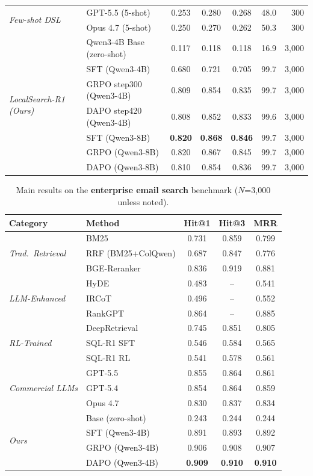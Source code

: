 \documentclass[11pt]{article}
\begin{document}
\begin{table}[t]
\begin{tabular}{llccccr}
\multirow{2}{*}{\textit{Few-shot DSL}}
& GPT-5.5 (5-shot) & 0.253 & 0.280 & 0.268 & 48.0 & 300 \\
& Opus 4.7 (5-shot) & 0.250 & 0.270 & 0.262 & 50.3 & 300 \\
\midrule
\multirow{7}{*}{\textit{LocalSearch-R1 (Ours)}}
& Qwen3-4B Base (zero-shot) & 0.117 & 0.118 & 0.118 & 16.9 & 3{,}000 \\
& SFT (Qwen3-4B) & 0.680 & 0.721 & 0.705 & 99.7 & 3{,}000 \\
& GRPO step300 (Qwen3-4B) & 0.809 & 0.854 & 0.835 & 99.7 & 3{,}000 \\
& DAPO step420 (Qwen3-4B) & 0.808 & 0.852 & 0.833 & 99.6 & 3{,}000 \\
& SFT (Qwen3-8B) & \textbf{0.820} & \textbf{0.868} & \textbf{0.846} & 99.7 & 3{,}000 \\
& GRPO (Qwen3-8B) & 0.820 & 0.867 & 0.845 & 99.7 & 3{,}000 \\
& DAPO (Qwen3-8B) & 0.810 & 0.854 & 0.836 & 99.7 & 3{,}000 \\
\bottomrule
\end{tabular}
\end{table}


\begin{table}[t]
\centering
\small
\caption{Main results on the \textbf{enterprise email search} benchmark ($N$=3{,}000 unless noted).}
\label{tab:main_email}
\begin{tabular}{llccc}
\toprule
\textbf{Category} & \textbf{Method} & \textbf{Hit@1} & \textbf{Hit@3} & \textbf{MRR} \\
\midrule
\multirow{3}{*}{\textit{Trad.\ Retrieval}}
& BM25 & 0.731 & 0.859 & 0.799 \\
& RRF (BM25+ColQwen) & 0.687 & 0.847 & 0.776 \\
& BGE-Reranker & 0.836 & 0.919 & 0.881 \\
\midrule
\multirow{3}{*}{\textit{LLM-Enhanced}}
& HyDE & 0.483 & -- & 0.541 \\
& IRCoT & 0.496 & -- & 0.552 \\
& RankGPT & 0.864 & -- & 0.885 \\
\midrule
\multirow{3}{*}{\textit{RL-Trained}}
& DeepRetrieval & 0.745 & 0.851 & 0.805 \\
& SQL-R1 SFT & 0.546 & 0.584 & 0.565 \\
& SQL-R1 RL & 0.541 & 0.578 & 0.561 \\
\midrule
\multirow{3}{*}{\textit{Commercial LLMs}}
& GPT-5.5 & 0.855 & 0.864 & 0.861 \\
& GPT-5.4 & 0.854 & 0.864 & 0.859 \\
& Opus 4.7 & 0.830 & 0.837 & 0.834 \\
\midrule
\multirow{6}{*}{\textit{Ours}}
& Base (zero-shot) & 0.243 & 0.244 & 0.244 \\
& SFT (Qwen3-4B) & 0.891 & 0.893 & 0.892 \\
& GRPO (Qwen3-4B) & 0.906 & 0.908 & 0.907 \\
& DAPO (Qwen3-4B) & \textbf{0.909} & \textbf{0.910} & \textbf{0.910} \\
\bottomrule
\end{tabular}
\end{table}
\end{document}
